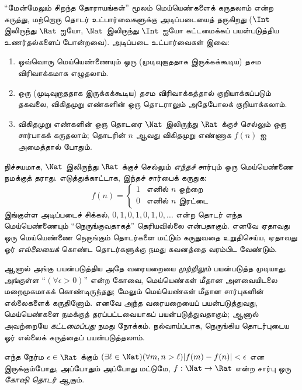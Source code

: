 \documentclass[../../../include/open-logic-section]{subfiles}
\begin{document}
``மேன்மேலும் சிறந்த தோராயங்கள்'' மூலம் மெய்யெண்களைக் கருதலாம்
என்ற கருத்து, மற்றொரு தொடர் உட்பார்வைகளுக்கு அடிப்படையைத் தருகிறது
($\Int$ இலிருந்து $\Rat$ ஐயோ, $\Nat$ இலிருந்து $\Int$ ஐயோ
கட்டமைக்கப் பயன்படுத்திய உணர்தல்களைப் போன்றவை).
அடிப்படை உட்பார்வைகள் இவை:
\begin{enumerate}
	\item ஒவ்வொரு மெய்யெண்ணையும் ஒரு (முடிவுறாததாக இருக்கக்கூடிய)
	தசம விரிவாக்கமாக எழுதலாம்.
	\item ஒரு (முடிவுறாததாக இருக்கக்கூடிய) தசம விரிவாக்கத்தால்
	குறியாக்கப்படும் தகவலை, விகிதமுறு எண்களின் ஒரு தொடராலும்
    அதேபோலக் குறியாக்கலாம்.
	\item விகிதமுறு எண்களின் ஒரு தொடரை $\Nat$ இலிருந்து $\Rat$ க்குச்
    செல்லும் ஒரு சார்பாகக் கருதலாம்; தொடரின் $n$ ஆவது விகிதமுறு
    எண்ணாக $f(n)$ ஐ அமைத்தால் போதும்.
\end{enumerate}
நிச்சயமாக, $\Nat$ இலிருந்து $\Rat$ க்குச் செல்லும் \emph{எந்தச்}
சார்பும் ஒரு மெய்யெண்ணை நமக்குத் தராது.
எடுத்துக்காட்டாக, இந்தச் சார்பைக் கருதுக:
\[
	f(n) =\begin{cases}
			1 & \text{எனில் }n\text{ ஒற்றை}\\
			0 &\text{எனில் }n\text{ இரட்டை}
		\end{cases}
\]
இங்குள்ள அடிப்படைச் சிக்கல், $0,1,0,1,0,1,0,\ldots$ என்ற தொடர்
எந்த மெய்யெண்ணையும் ``நெருங்குவதாகத்'' தெரியவில்லை என்பதாகும்.
எனவே ஏதாவது ஒரு மெய்யெண்ணை நெருங்கும் தொடர்களை மட்டும் கருதுவதை
உறுதிசெய்ய, ஏதாவது ஓர் \emph{எல்லையைக்} கொண்ட தொடர்களுக்கு
நமது கவனத்தை வரம்பிட வேண்டும்.

ஆனால் அங்கு பயன்படுத்திய அதே வரையறையை \emph{முற்றிலும்}
பயன்படுத்த முடியாது.
அங்குள்ள ``$(\forall \epsilon>0)$'' என்ற கோவை,
மெய்யெண்கள் மீதான அளவையிடலை மறைமுகமாகக் கொண்டிருந்தது;
மேலும் மெய்யெண்கள் மீதான சார்புகளின் எல்லைகளைக் கருதினோம்.
எனவே அந்த வரையறையைப் பயன்படுத்துவது,
மெய்யெண்களை நமக்குத் தரப்பட்டவையாகப் பயன்படுத்துவதாகும்;
ஆனால் அவற்றையே \emph{கட்டமைப்பது} நமது நோக்கம்.
நல்வாய்ப்பாக, நெருங்கிய தொடர்புடைய ஓர் எல்லைக் கருத்தைப் பயன்படுத்தலாம்.
\begin{defn}
  எந்த நேர்ம $\epsilon \in \Rat$ க்கும் $(\exists \ell \in
  \Nat)(\forall m, n > \ell)|f(m) - f(n)| < \epsilon$ என
  இருக்கும்போது, அப்போதும் அப்போது மட்டுமே,
  $f: \Nat \to \Rat$ என்ற சார்பு ஒரு \emph{கோஷி தொடர்} ஆகும்.
\end{defn}
\end{document}
